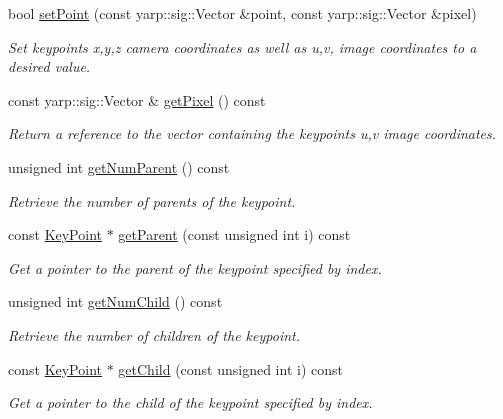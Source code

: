 \begin{DoxyCompactItemize}
bool \mbox{\hyperlink{classassistive__rehab_1_1KeyPoint_adcb8950f2c32cdf93c3d4b2f6a9f1a70}{set\+Point}} (const yarp\+::sig\+::\+Vector \&point, const yarp\+::sig\+::\+Vector \&pixel)
\begin{DoxyCompactList}\small\item\em Set keypoint\textquotesingle{}s x,y,z camera coordinates as well as u,v, image coordinates to a desired value. \end{DoxyCompactList}\item 
const yarp\+::sig\+::\+Vector \& \mbox{\hyperlink{classassistive__rehab_1_1KeyPoint_afebdf9ab021c866f00a2e8a3f9fc4c11}{get\+Pixel}} () const
\begin{DoxyCompactList}\small\item\em Return a reference to the vector containing the keypoint\textquotesingle{}s u,v image coordinates. \end{DoxyCompactList}\item 
unsigned int \mbox{\hyperlink{classassistive__rehab_1_1KeyPoint_acf31a6d7e9ae1be4aa992599435564ad}{get\+Num\+Parent}} () const
\begin{DoxyCompactList}\small\item\em Retrieve the number of parents of the keypoint. \end{DoxyCompactList}\item 
const \mbox{\hyperlink{classassistive__rehab_1_1KeyPoint}{Key\+Point}} $\ast$ \mbox{\hyperlink{classassistive__rehab_1_1KeyPoint_a0aa07ed9cc05471af65622fa05329cc3}{get\+Parent}} (const unsigned int i) const
\begin{DoxyCompactList}\small\item\em Get a pointer to the parent of the keypoint specified by index. \end{DoxyCompactList}\item 
unsigned int \mbox{\hyperlink{classassistive__rehab_1_1KeyPoint_aeb002852df51f7eaa5b719dc9b019863}{get\+Num\+Child}} () const
\begin{DoxyCompactList}\small\item\em Retrieve the number of children of the keypoint. \end{DoxyCompactList}\item 
const \mbox{\hyperlink{classassistive__rehab_1_1KeyPoint}{Key\+Point}} $\ast$ \mbox{\hyperlink{classassistive__rehab_1_1KeyPoint_a87aced4b21c5d5a8f67c7e1cb3936282}{get\+Child}} (const unsigned int i) const
\begin{DoxyCompactList}\small\item\em Get a pointer to the child of the keypoint specified by index. \end{DoxyCompactList}\end{DoxyCompactItemize}
